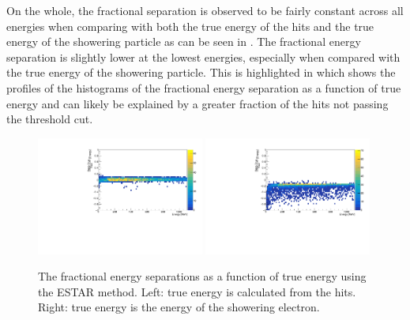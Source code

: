 On the whole, the fractional separation is observed to be fairly constant across all energies when comparing with both the true energy of the hits and the true energy of the showering particle as can be seen in . The fractional energy separation is slightly lower at the lowest energies, especially when compared with the true energy of the showering particle. This is highlighted in  which shows the profiles of the histograms of the fractional energy separation as a function of true energy and can likely be explained by a greater fraction of the hits not passing the threshold cut. 

\begin{figure}[h!]
    \centering
    \includegraphics[width = 0.49\textwidth]{figures-chap4/frac_res_vs_energy_cheating_electron_vertex_plane2_ESTAR.pdf}
    \includegraphics[width = 0.49\textwidth]{figures-chap4/frac_res_vs_energy_cheating_electron_vertex_plane2_ESTAR_showeringE.pdf}
    \caption[The fractional energy separations as a function of true energy.]{The fractional energy separations as a function of true energy using the ESTAR method. Left: true energy is calculated from the hits. Right: true energy is the energy of the showering electron.}
    \label{fig:reconstruction_as_a_function_of_energy}
\end{figure}


